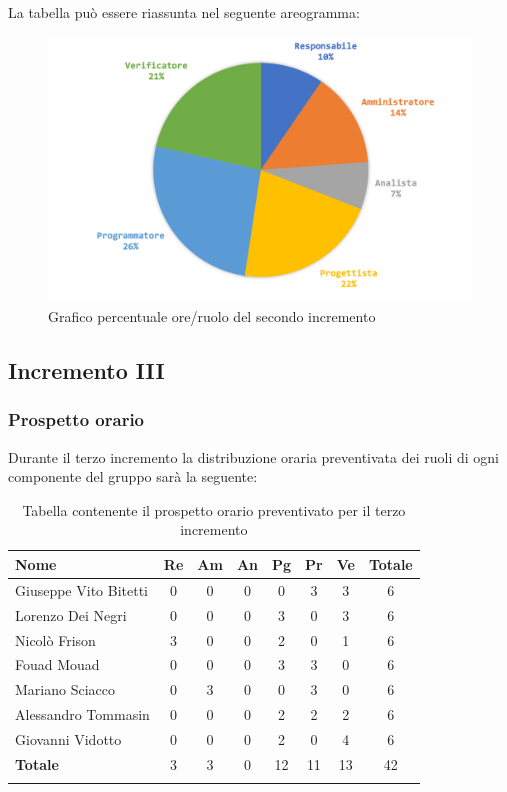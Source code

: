 		La tabella può essere riassunta nel seguente areogramma:
		\begin{figure}[H]
			\centering
			\includegraphics[width=0.8\linewidth]{./images/preventivo/incremento2-2.png}
			\caption{Grafico percentuale ore/ruolo del secondo incremento}
			\label{fig:grafico costi ruolo incremento II}
		\end{figure}


		
	\subsection{Incremento III}
		\subsubsection{Prospetto orario}
		Durante il terzo incremento la distribuzione oraria preventivata dei ruoli di ogni componente del gruppo sarà la seguente:
		
		\begin{longtable}{|l|c|c|c|c|c|c|c|}
			\hline
			\rowcolor{lighter-grayer}
			\textbf{Nome} & \textbf{Re} & \textbf{Am} & \textbf{An} & \textbf{Pg}  & \textbf{Pr}   & \textbf{Ve} & \textbf{Totale} \\
			\hline
			\endfirsthead
			
			\hline
			Giuseppe Vito Bitetti 		 & 0 & 0 & 0 & 0 & 3 & 3 & 6\\
			\hline
			\hline
			Lorenzo Dei Negri			 & 0 & 0 & 0 & 3 & 0 & 3 & 6\\
			\hline
			\hline
			Nicolò Frison				    & 3 & 0 & 0 & 2 & 0 & 1 & 6\\
			\hline
			\hline
			Fouad Mouad 				 & 0 & 0 & 0 & 3 & 3 & 0 & 6\\
			\hline
			\hline
			Mariano Sciacco 			 & 0 & 3 & 0 & 0 & 3 & 0 & 6\\
			\hline
			\hline
			Alessandro Tommasin     & 0 & 0 & 0 & 2 & 2 & 2 & 6\\
			\hline
			\hline
			Giovanni Vidotto 			 & 0 & 0 & 0 & 2 & 0 & 4 & 6\\
			\hline 
			\textbf{Totale}			 		& 3 & 3 & 0 & 12 & 11 & 13 & 42\\
			\hline
			\caption{Tabella contenente il prospetto orario preventivato per il terzo incremento}
		\end{longtable}
		\pagebreak
		

